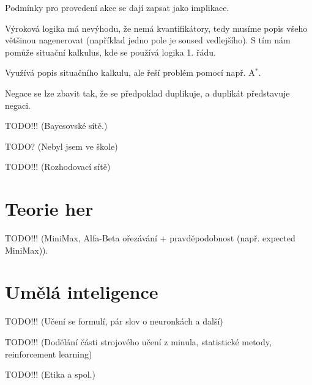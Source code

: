 \documentclass[12pt]{article}					%
\begin{document}
\begin{definice}
	Podmínky pro provedení akce se dají zapsat jako implikace.
\end{definice}

\begin{definice}
	Výroková logika má nevýhodu, že nemá kvantifikátory, tedy musíme popis všeho většinou nagenerovat (například jedno pole je soused vedlejšího). S tím nám pomůže situační kalkulus, kde se používá logika 1. řádu.
\end{definice}

\begin{definice}
	Využívá popis situačního kalkulu, ale řeší problém pomocí např. A$^*$.
\end{definice}

\begin{poznamka}
	Negace se lze zbavit tak, že se předpoklad duplikuje, a duplikát představuje negaci.
\end{poznamka}


TODO!!! (Bayesovské sítě.)


TODO? (Nebyl jsem ve škole)


TODO!!! (Rozhodovací sítě)


\section{Teorie her}

TODO!!! (MiniMax, Alfa-Beta ořezávání + pravděpodobnost (např. expected MiniMax)).


\section{Umělá inteligence}
TODO!!! (Učení se formulí, pár slov o neuronkách a další)


TODO!!! (Dodělání části strojového učení z minula, statistické metody, reinforcement learning)


TODO!!! (Etika a spol.)
\end{document}
